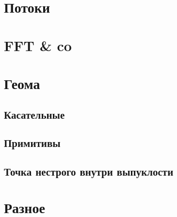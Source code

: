 \documentclass[a4paper,twocolumn,8pt]{extarticle}
\begin{document}
    \section{Потоки}
    
    

    \section{FFT \& co}
    
    \section{Геома}
    \subsection{Касательные}
    
    \subsection{Примитивы}
    
    \subsection{Точка нестрого внутри выпуклости}
    
    \section{Разное}
    
\end{document}
